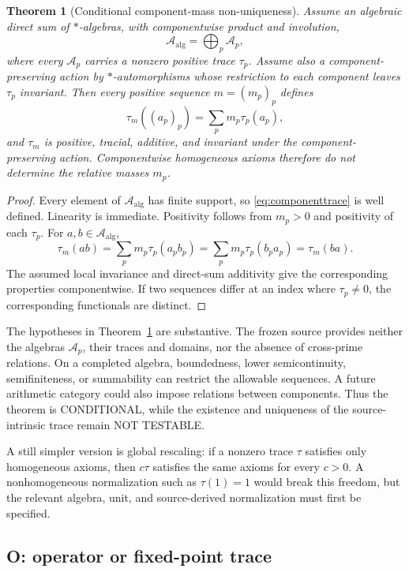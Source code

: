 \documentclass[11pt]{article}
\newtheorem{theorem}{Theorem}
\theoremstyle{definition}
\theoremstyle{remark}
\newcommand{\Aalg}{\mathcal A_{\mathrm{alg}}}
\newcommand{\conditional}{\textsf{CONDITIONAL}}
\newcommand{\nottest}{\textsf{NOT TESTABLE}}
\begin{document}
\begin{theorem}[Conditional component-mass non-uniqueness]
\label{thm:masses}
Assume an algebraic direct sum of \(*\)-algebras, with componentwise product
and involution,
\[
 \Aalg=\bigoplus_p\mathcal A_p,
\]
where every \(\mathcal A_p\) carries a nonzero positive trace \(\tau_p\).
Assume also a component-preserving action by \(*\)-automorphisms whose
restriction to each component leaves \(\tau_p\) invariant.  Then every
positive sequence
\(m=(m_p)_p\) defines
\begin{equation}
 \tau_m((a_p)_p)=\sum_p m_p\tau_p(a_p),
 \label{eq:componenttrace}
\end{equation}
and \(\tau_m\) is positive, tracial, additive, and invariant under the
component-preserving action.  Componentwise homogeneous axioms therefore do
not determine the relative masses \(m_p\).
\end{theorem}

\begin{proof}
Every element of \(\Aalg\) has finite support, so
\eqref{eq:componenttrace} is well defined.  Linearity is immediate.
Positivity follows from \(m_p>0\) and positivity of each \(\tau_p\).
For \(a,b\in\Aalg\),
\[
 \tau_m(ab)=\sum_p m_p\tau_p(a_pb_p)
           =\sum_p m_p\tau_p(b_pa_p)=\tau_m(ba).
\]
The assumed local invariance and direct-sum additivity give the corresponding
properties componentwise.  If two
sequences differ at an index where \(\tau_p\ne0\), the corresponding
functionals are distinct.
\end{proof}

The hypotheses in Theorem~\ref{thm:masses} are substantive.  The frozen
source provides neither the algebras \(\mathcal A_p\), their traces and
domains, nor the absence of cross-prime relations.  On a completed algebra,
boundedness, lower semicontinuity, semifiniteness, or summability can restrict
the allowable sequences.  A future arithmetic category could also impose
relations between components.  Thus the theorem is \conditional, while the
existence and uniqueness of the source-intrinsic trace remain \nottest.

A still simpler version is global rescaling: if a nonzero trace \(\tau\)
satisfies only homogeneous axioms, then \(c\tau\) satisfies the same axioms
for every \(c>0\).  A nonhomogeneous normalization such as \(\tau(1)=1\)
would break this freedom, but the relevant algebra, unit, and source-derived
normalization must first be specified.

\subsection{O: operator or fixed-point trace}
\end{document}
